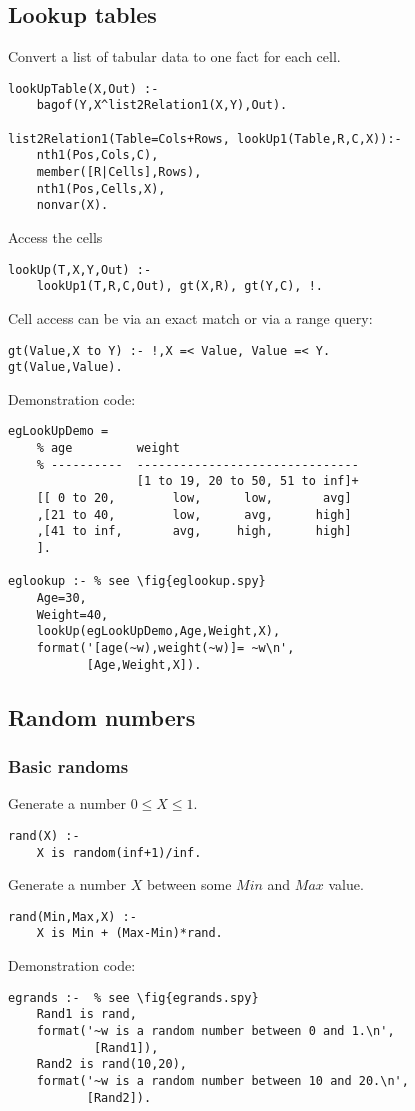 \subsection{ Lookup tables
}
\label{sec:lookuptables}
Convert a list of tabular data to one
fact for each cell.
\begin{Verbatim}
lookUpTable(X,Out) :-
    bagof(Y,X^list2Relation1(X,Y),Out).

list2Relation1(Table=Cols+Rows, lookUp1(Table,R,C,X)):-
    nth1(Pos,Cols,C),
    member([R|Cells],Rows),
    nth1(Pos,Cells,X),
    nonvar(X).
\end{Verbatim}
Access the cells 
\begin{Verbatim}
lookUp(T,X,Y,Out) :-
    lookUp1(T,R,C,Out), gt(X,R), gt(Y,C), !.
\end{Verbatim}
Cell access can be via an exact match or
via a range query:
\begin{Verbatim}
gt(Value,X to Y) :- !,X =< Value, Value =< Y.
gt(Value,Value).
\end{Verbatim}
Demonstration code:
\begin{Verbatim}
egLookUpDemo =
    % age         weight
    % ----------  -------------------------------
                  [1 to 19, 20 to 50, 51 to inf]+
    [[ 0 to 20,        low,      low,       avg]
    ,[21 to 40,        low,      avg,      high]
    ,[41 to inf,       avg,     high,      high]
    ].

eglookup :- % see \fig{eglookup.spy}
    Age=30,
    Weight=40,
    lookUp(egLookUpDemo,Age,Weight,X),
    format('[age(~w),weight(~w)]= ~w\n',
           [Age,Weight,X]).
\end{Verbatim}
\subsection{ Random numbers
}
\subsubsection{ Basic randoms
}
\label{sec:rands}
Generate a number $0 \le X \le 1$.
\begin{Verbatim}
rand(X) :- 
    X is random(inf+1)/inf.
\end{Verbatim}
Generate a number $X$ between  some $Min$ and
$Max$ value.
\begin{Verbatim}
rand(Min,Max,X) :- 
    X is Min + (Max-Min)*rand.
\end{Verbatim}
Demonstration code:
\begin{Verbatim}
egrands :-  % see \fig{egrands.spy}
    Rand1 is rand, 
    format('~w is a random number between 0 and 1.\n',
            [Rand1]),
    Rand2 is rand(10,20),
    format('~w is a random number between 10 and 20.\n',
           [Rand2]).
\end{Verbatim}           
